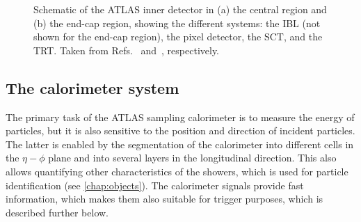 
\FloatBarrier
\begin{figure}
    \caption[Schematic of the ATLAS inner detector.]{Schematic of the ATLAS inner detector in (a) the central region and (b) the end-cap region, showing the different systems: the IBL (not shown for the end-cap region), the pixel detector, the SCT, and the TRT. Taken from Refs.~\cite{ATL-PHYS-PUB-2015-009} and~\cite{PERF-2007-01}, respectively.}
    \label{fig:ATLASinnerdetector}
\end{figure}





\subsection{The calorimeter system}
\label{subsec:calorimeter}
The primary task of the ATLAS sampling calorimeter is to measure the energy of particles, but it is also sensitive to the position and direction of incident particles. The latter is enabled by the segmentation of the calorimeter into different cells in the $\eta-\phi$ plane and into several layers in the longitudinal direction.
This also allows quantifying other characteristics of the showers, which is used for particle identification (see \cref{chap:objects}).
The calorimeter signals provide fast information, which makes them also suitable for trigger purposes, which is described further below.


